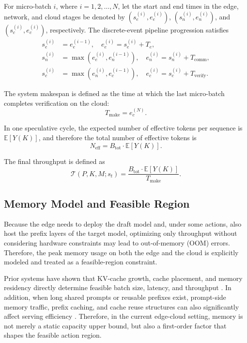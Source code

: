 \documentclass[a4paper,fleqn]{cas-dc}
\begin{document}
For micro-batch $i$, where $i=1,2,\dots,N$, let the start and end times in the edge, network, and cloud stages be denoted by $(s_e^{(i)}, e_e^{(i)})$, $(s_n^{(i)}, e_n^{(i)})$, and $(s_c^{(i)}, e_c^{(i)})$, respectively. The discrete-event pipeline progression satisfies
\begin{align}
s_e^{(i)} &= e_e^{(i-1)}, \quad e_e^{(i)} = s_e^{(i)} + T_e, \\
s_n^{(i)} &= \max(e_e^{(i)}, e_n^{(i-1)}), \quad e_n^{(i)} = s_n^{(i)} + T_{\mathrm{comm}}, \\
s_c^{(i)} &= \max(e_n^{(i)}, e_c^{(i-1)}), \quad e_c^{(i)} = s_c^{(i)} + T_{\mathrm{verify}}.
\end{align}

The system makespan is defined as the time at which the last micro-batch completes verification on the cloud:
\begin{equation}
T_{\mathrm{make}} = e_c^{(N)}.
\end{equation}

In one speculative cycle, the expected number of effective tokens per sequence is $\mathbb{E}[Y(K)]$, and therefore the total number of effective tokens is
\begin{equation}
N_{\mathrm{eff}} = B_{\mathrm{tot}} \cdot \mathbb{E}[Y(K)].
\end{equation}

The final throughput is defined as
\begin{equation}
\mathcal{T}(P,K,M; s_t) = \frac{B_{\mathrm{tot}} \cdot \mathbb{E}[Y(K)]}{T_{\mathrm{make}}}.
\end{equation}

\subsection{Memory Model and Feasible Region}

Because the edge needs to deploy the draft model and, under some actions, also host the prefix layers of the target model, optimizing only throughput without considering hardware constraints may lead to out-of-memory (OOM) errors. Therefore, the peak memory usage on both the edge and the cloud is explicitly modeled and treated as a feasible-region constraint.

Prior systems have shown that KV-cache growth, cache placement, and memory residency directly determine feasible batch size, latency, and throughput \cite{kwon2023pagedattention,liu2024cachegen,pan2025marconi,qin2025mooncake,zhang2025jenga}. In addition, when long shared prompts or reusable prefixes exist, prompt-side memory traffic, prefix caching, and cache reuse structures can also significantly affect serving efficiency \cite{wang2025kvcachewild,dexter2026llm,zhu2024relayattention}. Therefore, in the current edge-cloud setting, memory is not merely a static capacity upper bound, but also a first-order factor that shapes the feasible action region.
\end{document}
